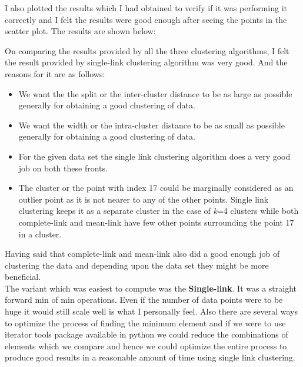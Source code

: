 \documentclass[11pt]{article}
\begin{document}
\begin{itemize}
	
	I also plotted the results which I had obtained to verify if it was performing it correctly and I felt the results were good enough after seeing the points in the scatter plot. The results are shown below:
	
	\begin{figure}[H]%
		\centering
	\end{figure}
	
	On comparing the results provided by all the three clustering algorithms, I felt the result provided by single-link clustering algorithm was very good. And the reasons for it are as follows:
	
	\begin{itemize}
		\item We want the the split or the inter-cluster distance to be as large as possible generally for obtaining a good clustering of data.
		\item We want the width or the intra-cluster distance to be as small as possible generally for obtaining a good clustering of data.
		\item For the given data set the single link clustering algorithm does a very good job on both these fronts. 
		\item The cluster or the point with index 17 could be marginally considered as  an outlier point as it is not nearer to any of the other points. Single link clustering keeps it as a separate cluster in the case of \emph k=4 clusters while both complete-link and mean-link have few other points surrounding the point 17 in a cluster.
	\end{itemize}	
	
	Having said that complete-link and mean-link also did a good enough job of clustering the data and depending upon the data set they might be more beneficial.\\
	
	The variant which was easiest to compute was the \textbf{Single-link}. It was a straight forward min of min operations. Even if the number of data points were to be huge it would still scale well is what I personally feel. Also there are several ways to optimize the process of finding the minimum element and if we were to use iterator tools package available in python we could reduce the combinations of elements which we compare and hence we could optimize the entire process to produce good results in a reasonable amount of time using single link clustering.\\
	

\end{itemize}
\end{document}
